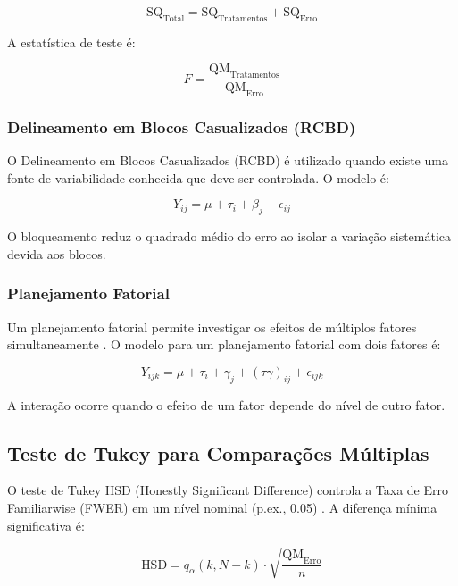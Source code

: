 \documentclass[12pt,a4paper,oneside]{article}
\begin{document}
\begin{equation}
\text{SQ}_{\text{Total}} = \text{SQ}_{\text{Tratamentos}} + \text{SQ}_{\text{Erro}}
\end{equation}

A estatística de teste é:

\begin{equation}
F = \frac{\text{QM}_{\text{Tratamentos}}}{\text{QM}_{\text{Erro}}}
\end{equation}

\subsubsection{Delineamento em Blocos Casualizados (RCBD)}

O Delineamento em Blocos Casualizados (RCBD) é utilizado quando existe uma fonte de variabilidade conhecida que deve ser controlada. O modelo é:

\begin{equation}
Y_{ij} = \mu + \tau_i + \beta_j + \epsilon_{ij}
\end{equation}

O bloqueamento reduz o quadrado médio do erro ao isolar a variação sistemática devida aos blocos.

\subsubsection{Planejamento Fatorial}

Um planejamento fatorial permite investigar os efeitos de múltiplos fatores simultaneamente \cite{montgomery2013}. O modelo para um planejamento fatorial com dois fatores é:

\begin{equation}
Y_{ijk} = \mu + \tau_i + \gamma_j + (\tau\gamma)_{ij} + \epsilon_{ijk}
\end{equation}

A interação ocorre quando o efeito de um fator depende do nível de outro fator.

\subsection{Teste de Tukey para Comparações Múltiplas}

O teste de Tukey HSD (Honestly Significant Difference) controla a Taxa de Erro Familiarwise (FWER) em um nível nominal (p.ex., 0.05) \cite{montgomery2016}. A diferença mínima significativa é:

\begin{equation}
\text{HSD} = q_{\alpha}(k, N-k) \cdot \sqrt{\frac{\text{QM}_{\text{Erro}}}{n}}
\end{equation}
\end{document}
